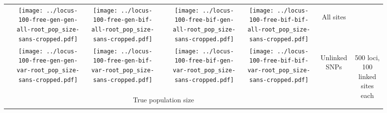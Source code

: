 \documentclass[border=10pt,varwidth=30cm]{standalone}
\begin{document}
\begin{figure}
\begin{tabular}{@{}cccccccc@{}}
        & \texttt{[image: ../locus-100-free-gen-gen-all-root\_pop\_size-sans-cropped.pdf]}
        & \texttt{[image: ../locus-100-free-gen-bif-all-root\_pop\_size-sans-cropped.pdf]}
        &
        & \texttt{[image: ../locus-100-free-bif-gen-all-root\_pop\_size-sans-cropped.pdf]}
        & \texttt{[image: ../locus-100-free-bif-bif-all-root\_pop\_size-sans-cropped.pdf]}
        & \multicolumn{1}{c|}{\multirow{1}{*}[9em]{\begin{sideways}\Large All sites\end{sideways}}}
        & \\
        & \texttt{[image: ../locus-100-free-gen-gen-var-root\_pop\_size-sans-cropped.pdf]}
        & \texttt{[image: ../locus-100-free-gen-bif-var-root\_pop\_size-sans-cropped.pdf]}
        &
        & \texttt{[image: ../locus-100-free-bif-gen-var-root\_pop\_size-sans-cropped.pdf]}
        & \texttt{[image: ../locus-100-free-bif-bif-var-root\_pop\_size-sans-cropped.pdf]}
        & \multicolumn{1}{c|}{\multirow{1}{*}[10em]{\begin{sideways}\Large Unlinked SNPs\end{sideways}}}
        & \multirow{2}{*}[23em]{\begin{sideways}\LARGE 500 loci, 100 linked sites each\end{sideways}} \\
        & \multicolumn{5}{c}{\Large True population size} & & \\
    \end{tabular}
\end{figure}
\end{document}
